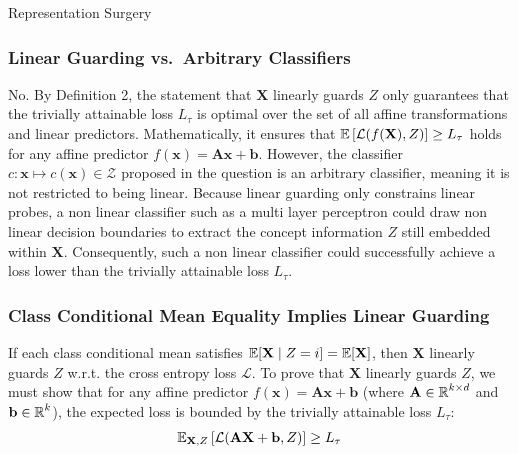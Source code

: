 \begin{question}{Representation Surgery}

\begin{subquestion}

\subsubsection*{Linear Guarding vs.\ Arbitrary Classifiers}

No. 
By Definition 2, the statement that $\mathbf{X}$ linearly guards $Z$ only guarantees that the trivially attainable loss $L_\tau$ is optimal over the set of all affine transformations and linear predictors. 
Mathematically, it ensures that $\expectation\left[\mathcal{L}(f(\mathbf{X}), Z)\right] \geq L_\tau$ holds for any affine predictor $f(\mathbf{x}) = \mathbf{A}\mathbf{x} + \mathbf{b}$.
However, the classifier $c : \mathbf{x} \mapsto c(\mathbf{x}) \in \mathcal{Z}$ proposed in the question is an arbitrary classifier, meaning it is not restricted to being linear.
Because linear guarding only constrains linear probes, a non linear classifier such as a multi layer perceptron could draw non linear decision boundaries to extract the concept information $Z$ still embedded within $\mathbf{X}$.
Consequently, such a non linear classifier could successfully achieve a loss lower than the trivially attainable loss $L_\tau$.

\end{subquestion}

\begin{subquestion}

\subsubsection*{Class Conditional Mean Equality Implies Linear Guarding}

If each class conditional mean satisfies $\expectation[\mathbf{X} \mid Z = i] = \expectation[\mathbf{X}]$, then $\mathbf{X}$ linearly guards $Z$ w.r.t. the cross entropy loss $\mathcal{L}$. 
To prove that $\mathbf{X}$ linearly guards $Z$, we must show that for any affine predictor $f(\mathbf{x}) = \mathbf{A}\mathbf{x} + \mathbf{b}$ (where $\mathbf{A} \in \R^{k \times d}$ and $\mathbf{b} \in \R^k$), the expected loss is bounded by the trivially attainable loss $L_\tau$:
\begin{equation}
    \expectation_{\mathbf{X}, Z}\left[\mathcal{L}(\mathbf{A}\mathbf{X} + \mathbf{b}, Z)\right] \geq L_\tau
\end{equation}


\end{subquestion}
\end{question}
